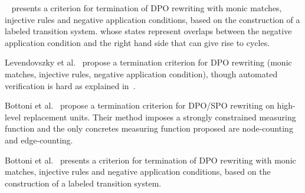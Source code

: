 ~\cite{Bottoni2010_termination} presents a criterion for termination of DPO rewriting with monic matches, injective rules and negative application conditions, based on the construction of a labeled transition system.
whose states represent overlaps between the negative application condition and the right hand side that can give rise to cycles.

Levendovszky et al.~\cite{levendovszky2007termination} propose a termination criterion for DPO rewriting (monic matches, injective rules, negative application condition), though automated verification is hard as explained in~\cite[]{levendovszky2007termination}. 

Bottoni et al.~\cite{bottoni2005termination} propose a termination criterion for DPO/SPO rewriting on high-level replacement units. Their method imposes a strongly constrained measuring function and the only concretes measuring function proposed are node-counting and edge-counting.

Bottoni et al.~\cite{bottoni2010atermination} presents a criterion for termination of DPO rewriting with monic matches, injective rules and negative application conditions, based on the construction of a labeled transition system. 

